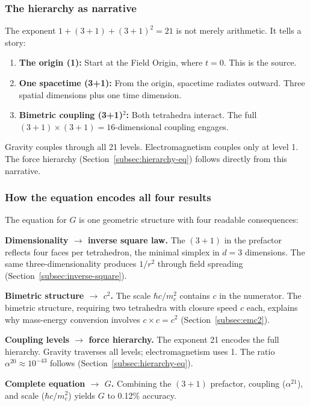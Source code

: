\documentclass[aps,prd,preprint,superscriptaddress,showpacs,preprintnumbers,amsmath,amssymb,nofootinbib]{revtex4-2}
\begin{document}
\subsubsection*{The hierarchy as narrative}

The exponent $1 + (3+1) + (3+1)^2 = 21$ is not merely arithmetic. It tells a story:

\begin{enumerate}
\item \textbf{The origin (1):} Start at the Field Origin, where $t = 0$. This is the source.
\item \textbf{One spacetime (3+1):} From the origin, spacetime radiates outward. Three spatial dimensions plus one time dimension.
\item \textbf{Bimetric coupling (3+1)$^2$:} Both tetrahedra interact. The full $(3+1) \times (3+1) = 16$-dimensional coupling engages.
\end{enumerate}

Gravity couples through all 21 levels. Electromagnetism couples only at level 1. The force hierarchy (Section~\ref{subsec:hierarchy-eq}) follows directly from this narrative.

\subsubsection*{How the equation encodes all four results}

The equation for $G$ is one geometric structure with four readable consequences:

\textbf{Dimensionality $\rightarrow$ inverse square law.} The $(3+1)$ in the prefactor reflects four faces per tetrahedron, the minimal simplex in $d = 3$ dimensions. The same three-dimensionality produces $1/r^2$ through field spreading (Section~\ref{subsec:inverse-square}).

\textbf{Bimetric structure $\rightarrow$ $c^2$.} The scale $\hbar c/m_e^2$ contains $c$ in the numerator. The bimetric structure, requiring two tetrahedra with closure speed $c$ each, explains why mass-energy conversion involves $c \times c = c^2$ (Section~\ref{subsec:emc2}).

\textbf{Coupling levels $\rightarrow$ force hierarchy.} The exponent 21 encodes the full hierarchy. Gravity traverses all levels; electromagnetism uses 1. The ratio $\alpha^{20} \approx 10^{-43}$ follows (Section~\ref{subsec:hierarchy-eq}).

\textbf{Complete equation $\rightarrow$ $G$.} Combining the $(3+1)$ prefactor, coupling ($\alpha^{21}$), and scale ($\hbar c/m_e^2$) yields $G$ to 0.12\% accuracy.
\end{document}
